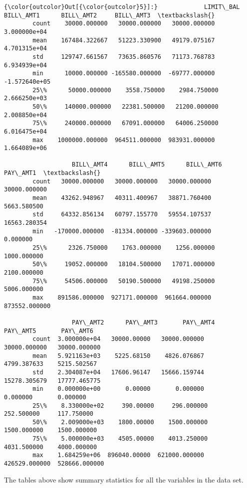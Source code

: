 \documentclass[11pt]{article}
\begin{document}
\begin{Verbatim}[commandchars=\\\{\}]
{\color{outcolor}Out[{\color{outcolor}5}]:}             LIMIT\_BAL      BILL\_AMT1      BILL\_AMT2     BILL\_AMT3  \textbackslash{}
        count    30000.000000   30000.000000   30000.000000  3.000000e+04   
        mean    167484.322667   51223.330900   49179.075167  4.701315e+04   
        std     129747.661567   73635.860576   71173.768783  6.934939e+04   
        min      10000.000000 -165580.000000  -69777.000000 -1.572640e+05   
        25\%      50000.000000    3558.750000    2984.750000  2.666250e+03   
        50\%     140000.000000   22381.500000   21200.000000  2.008850e+04   
        75\%     240000.000000   67091.000000   64006.250000  6.016475e+04   
        max    1000000.000000  964511.000000  983931.000000  1.664089e+06   
        
                   BILL\_AMT4      BILL\_AMT5      BILL\_AMT6       PAY\_AMT1  \textbackslash{}
        count   30000.000000   30000.000000   30000.000000   30000.000000   
        mean    43262.948967   40311.400967   38871.760400    5663.580500   
        std     64332.856134   60797.155770   59554.107537   16563.280354   
        min   -170000.000000  -81334.000000 -339603.000000       0.000000   
        25\%      2326.750000    1763.000000    1256.000000    1000.000000   
        50\%     19052.000000   18104.500000   17071.000000    2100.000000   
        75\%     54506.000000   50190.500000   49198.250000    5006.000000   
        max    891586.000000  927171.000000  961664.000000  873552.000000   
        
                   PAY\_AMT2      PAY\_AMT3       PAY\_AMT4       PAY\_AMT5       PAY\_AMT6  
        count  3.000000e+04   30000.00000   30000.000000   30000.000000   30000.000000  
        mean   5.921163e+03    5225.68150    4826.076867    4799.387633    5215.502567  
        std    2.304087e+04   17606.96147   15666.159744   15278.305679   17777.465775  
        min    0.000000e+00       0.00000       0.000000       0.000000       0.000000  
        25\%    8.330000e+02     390.00000     296.000000     252.500000     117.750000  
        50\%    2.009000e+03    1800.00000    1500.000000    1500.000000    1500.000000  
        75\%    5.000000e+03    4505.00000    4013.250000    4031.500000    4000.000000  
        max    1.684259e+06  896040.00000  621000.000000  426529.000000  528666.000000  
\end{Verbatim}
            
    The tables above show summary statistics for all the variables in the
data set.
\end{document}
